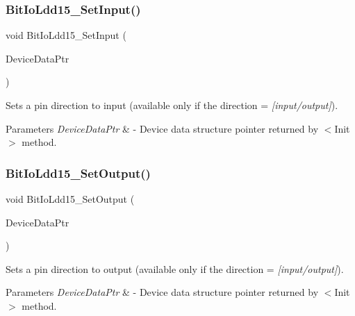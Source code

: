 \subsubsection{\texorpdfstring{Bit\+Io\+Ldd15\+\_\+\+Set\+Input()}{BitIoLdd15\_SetInput()}}
{\footnotesize\ttfamily void Bit\+Io\+Ldd15\+\_\+\+Set\+Input (\begin{DoxyParamCaption}\item[{\hyperlink{group___p_e___types__module_gac5cf1362f1f0e3a2ce71b1bf2276d091}{L\+D\+D\+\_\+\+T\+Device\+Data} $\ast$}]{Device\+Data\+Ptr }\end{DoxyParamCaption})}



Sets a pin direction to input (available only if the direction = {\itshape \mbox{[}input/output\mbox{]}}). 


\begin{DoxyParams}{Parameters}
{\em Device\+Data\+Ptr} & -\/ Device data structure pointer returned by $<$\+Init$>$ method. \\
\hline
\end{DoxyParams}
\mbox{\label{group___bit_io_ldd15__module_ga507454e3c3f8d84768c97902fad489a1}} 
\subsubsection{\texorpdfstring{Bit\+Io\+Ldd15\+\_\+\+Set\+Output()}{BitIoLdd15\_SetOutput()}}
{\footnotesize\ttfamily void Bit\+Io\+Ldd15\+\_\+\+Set\+Output (\begin{DoxyParamCaption}\item[{\hyperlink{group___p_e___types__module_gac5cf1362f1f0e3a2ce71b1bf2276d091}{L\+D\+D\+\_\+\+T\+Device\+Data} $\ast$}]{Device\+Data\+Ptr }\end{DoxyParamCaption})}



Sets a pin direction to output (available only if the direction = {\itshape \mbox{[}input/output\mbox{]}}). 


\begin{DoxyParams}{Parameters}
{\em Device\+Data\+Ptr} & -\/ Device data structure pointer returned by $<$\+Init$>$ method. \\
\hline
\end{DoxyParams}
\mbox{\label{group___bit_io_ldd15__module_ga49339ddbfe8f0278ee4f854d61235f4d}} 
